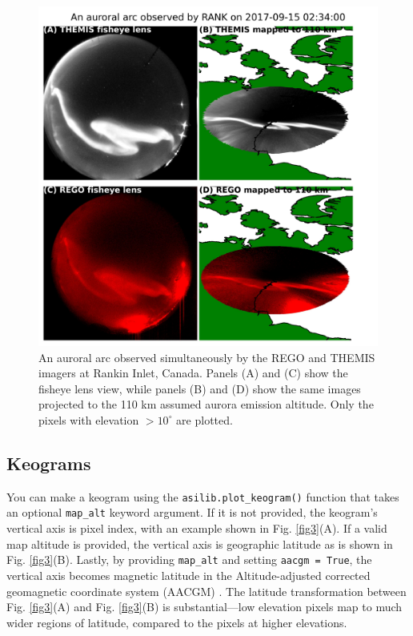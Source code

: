 \documentclass[utf8]{FrontiersinHarvard} %
\begin{document}
\begin{figure}
      \includegraphics[width=\textwidth]{figures/fig2.jpg}
      \caption{An auroral arc observed simultaneously by the REGO and THEMIS imagers at Rankin Inlet, Canada. Panels (A) and (C) show the fisheye lens view, while panels (B) and (D) show the same images projected to the 110 km assumed aurora emission altitude. Only the pixels with elevation $>10^\circ$ are plotted.}
      \label{fig2}
\end{figure}

\subsection{Keograms}
You can make a keogram using the \verb|asilib.plot_keogram()| function that takes an optional \verb|map_alt| keyword argument. If it is not provided, the keogram's vertical axis is pixel index, with an example shown in Fig. \ref{fig3}(A). If a valid map altitude is provided, the vertical axis is geographic latitude as is shown in Fig. \ref{fig3}(B). Lastly, by providing \verb|map_alt| and setting \verb|aacgm = True|, the vertical axis becomes magnetic latitude in the Altitude-adjusted corrected geomagnetic coordinate system (AACGM) \citep{Shepherd2014}.
The latitude transformation between Fig. \ref{fig3}(A) and Fig. \ref{fig3}(B) is substantial---low elevation pixels map to much wider regions of latitude, compared to the pixels at higher elevations.
\end{document}
